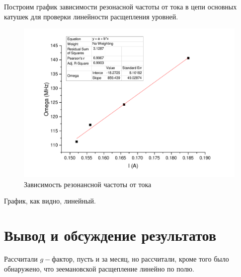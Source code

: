 \documentclass[a4paper,12pt]{article}
\begin{document}
    
    Построим график зависимости резонасной частоты от тока в цепи основных катушек для проверки линейности расщепления уровней.
    
    \begin{figure}
        \centering
        \includegraphics[width = 0.8\linewidth]{lin.pdf}
        \caption{Зависимость резонансной частоты от тока}
    \end{figure}
    
    График, как видно, линейный.
    
    \section{Вывод и обсуждение результатов}
        Рассчитали $g-$фактор, пусть и за месяц, но рассчитали, кроме того было обнаружено, что зеемановской расщепление линейно по полю.
    
\end{document}
